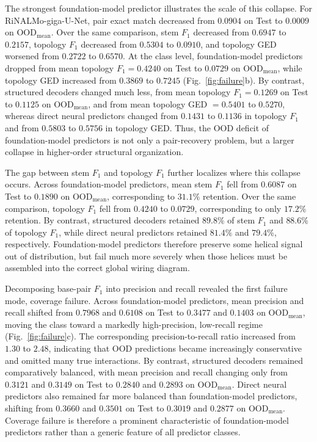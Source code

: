 \documentclass[pdflatex,sn-mathphys-num]{sn-jnl}%
\theoremstyle{thmstyleone}%
\theoremstyle{thmstyletwo}%
\theoremstyle{thmstylethree}%
\begin{document}
The strongest foundation-model predictor illustrates the scale of this collapse.
For RiNALMo-giga-U-Net, pair exact match decreased from $0.0904$ on Test to $0.0009$ on $\mathrm{OOD}_{\mathrm{mean}}$.
Over the same comparison, stem $F_1$ decreased from $0.6947$ to $0.2157$, topology $F_1$ decreased from $0.5304$ to $0.0910$, and topology GED worsened from $0.2722$ to $0.6570$.
At the class level, foundation-model predictors dropped from mean topology $F_1 = 0.4240$ on Test to $0.0729$ on $\mathrm{OOD}_{\mathrm{mean}}$, while topology GED increased from $0.3869$ to $0.7245$ (Fig.~\ref{fig:failure}b).
By contrast, structured decoders changed much less, from mean topology $F_1 = 0.1269$ on Test to $0.1125$ on $\mathrm{OOD}_{\mathrm{mean}}$, and from mean topology GED $= 0.5401$ to $0.5270$, whereas direct neural predictors changed from $0.1431$ to $0.1136$ in topology $F_1$ and from $0.5803$ to $0.5756$ in topology GED.
Thus, the OOD deficit of foundation-model predictors is not only a pair-recovery problem, but a larger collapse in higher-order structural organization.

The gap between stem $F_1$ and topology $F_1$ further localizes where this collapse occurs.
Across foundation-model predictors, mean stem $F_1$ fell from $0.6087$ on Test to $0.1890$ on $\mathrm{OOD}_{\mathrm{mean}}$, corresponding to $31.1\%$ retention.
Over the same comparison, topology $F_1$ fell from $0.4240$ to $0.0729$, corresponding to only $17.2\%$ retention.
By contrast, structured decoders retained $89.8\%$ of stem $F_1$ and $88.6\%$ of topology $F_1$, while direct neural predictors retained $81.4\%$ and $79.4\%$, respectively.
Foundation-model predictors therefore preserve some helical signal out of distribution, but fail much more severely when those helices must be assembled into the correct global wiring diagram.

Decomposing base-pair $F_1$ into precision and recall revealed the first failure mode, coverage failure.
Across foundation-model predictors, mean precision and recall shifted from $0.7968$ and $0.6108$ on Test to $0.3477$ and $0.1403$ on $\mathrm{OOD}_{\mathrm{mean}}$, moving the class toward a markedly high-precision, low-recall regime (Fig.~\ref{fig:failure}c).
The corresponding precision-to-recall ratio increased from $1.30$ to $2.48$, indicating that OOD predictions became increasingly conservative and omitted many true interactions.
By contrast, structured decoders remained comparatively balanced, with mean precision and recall changing only from $0.3121$ and $0.3149$ on Test to $0.2840$ and $0.2893$ on $\mathrm{OOD}_{\mathrm{mean}}$.
Direct neural predictors also remained far more balanced than foundation-model predictors, shifting from $0.3660$ and $0.3501$ on Test to $0.3019$ and $0.2877$ on $\mathrm{OOD}_{\mathrm{mean}}$.
Coverage failure is therefore a prominent characteristic of foundation-model predictors rather than a generic feature of all predictor classes.
\end{document}
